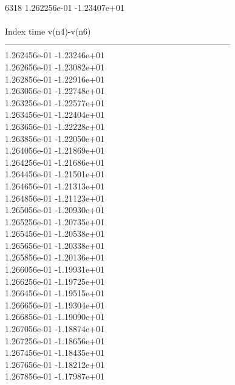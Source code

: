 6318	1.262256e-01	-1.23407e+01	\\ \hline
\\ \hline
Index   time            v(n4)-v(n6)     \\ \hline
--------------------------------------------------------------------------------\\ 	1.262456e-01	-1.23246e+01	\\ 	1.262656e-01	-1.23082e+01	\\ 	1.262856e-01	-1.22916e+01	\\ 	1.263056e-01	-1.22748e+01	\\ 	1.263256e-01	-1.22577e+01	\\ 	1.263456e-01	-1.22404e+01	\\ 	1.263656e-01	-1.22228e+01	\\ 	1.263856e-01	-1.22050e+01	\\ 	1.264056e-01	-1.21869e+01	\\ 	1.264256e-01	-1.21686e+01	\\ 	1.264456e-01	-1.21501e+01	\\ 	1.264656e-01	-1.21313e+01	\\ 	1.264856e-01	-1.21123e+01	\\ 	1.265056e-01	-1.20930e+01	\\ 	1.265256e-01	-1.20735e+01	\\ 	1.265456e-01	-1.20538e+01	\\ 	1.265656e-01	-1.20338e+01	\\ 	1.265856e-01	-1.20136e+01	\\ 	1.266056e-01	-1.19931e+01	\\ 	1.266256e-01	-1.19725e+01	\\ 	1.266456e-01	-1.19515e+01	\\ 	1.266656e-01	-1.19304e+01	\\ 	1.266856e-01	-1.19090e+01	\\ 	1.267056e-01	-1.18874e+01	\\ 	1.267256e-01	-1.18656e+01	\\ 	1.267456e-01	-1.18435e+01	\\ 	1.267656e-01	-1.18212e+01	\\ 	1.267856e-01	-1.17987e+01	\\ \hline
